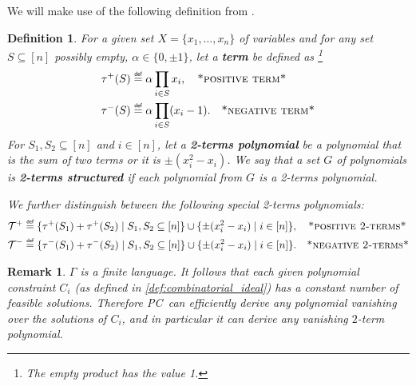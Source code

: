 \documentclass[11pt]{article}
\newcommand\mydef{\mathrel{\overset{\makebox[0pt]{\mbox{\normalfont\tiny\sffamily def}}}{=}}}
\newcommand{\PC}{\textsc{PC}}
\newcommand{\1}{\textbf{1}}
\newcommand{\T}{\mathcal{T}}
\newtheorem{definition}[theorem]{Definition}
\newtheorem{remark}[theorem]{Remark}
\begin{document}
We will make use of the following definition from \cite{Mastrolilli21TALG}.
\begin{definition}\label{def:2terms}
  For a given set $X=\{x_1,\ldots,x_n\}$ of variables and for any set $S\subseteq [n]$ possibly empty, $\alpha\in \{0, \pm 1\}$, let a \textbf{\emph{term}} be defined as \footnote{The empty product has the value 1.}
  \begin{align*}
    \tau^+(S)&\mydef \alpha\prod_{i\in S}x_i, \quad \textsc{*positive term*} \\
    \tau^-(S)&\mydef\alpha\prod_{i\in S}(x_i-1). \quad \textsc{*negative term*}
  \end{align*}
For $S_1,S_2\subseteq [n]$ and $i\in [n]$, let a \textbf{\emph{2-terms polynomial}} be a polynomial that is the sum of two terms or it is $\pm(x_i^2-x_i)$.
We say that a set $G$ of polynomials is \textbf{\emph{2-terms structured}} if each polynomial from $G$ is a 2-terms polynomial.

  We further distinguish between the following special 2-terms polynomials:
  \begin{align*}
    \T^+ & \mydef \{\tau^+(S_1)+\tau^+(S_2)\mid S_1,S_2\subseteq[n]\} \cup\{\pm(x_i^2-x_i)\mid i\in [n]\},  \quad \textsc{*positive 2-terms*}\\
    \T^- & \mydef \{\tau^-(S_1)+\tau^-(S_2)\mid S_1,S_2\subseteq[n]\} \cup\{\pm(x_i^2-x_i)\mid i\in [n]\}. \quad \textsc{*negative 2-terms*}
  \end{align*}
  \end{definition}


\begin{remark}
$\Gamma$ is a finite language. It follows that each given polynomial constraint $C_i$ (as defined in \cref{def:combinatorial_ideal}) has a constant number of feasible solutions.
Therefore \PC\ can efficiently derive any polynomial vanishing over the solutions of $C_i$, and in particular it can derive any vanishing $2$-term polynomial.
\end{remark}
\end{document}

